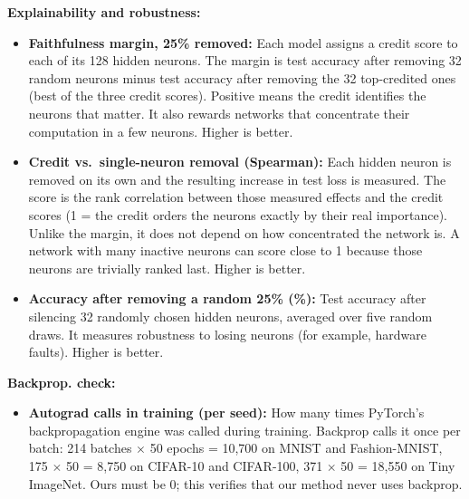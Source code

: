 \documentclass{article}
\begin{document}
{\noindent\textbf{Explainability and robustness:}
\begin{itemize}
  \item \textbf{Faithfulness margin, 25\% removed:} Each model assigns a credit score to each of its 128 hidden neurons. The margin is test accuracy after removing 32 random neurons minus test accuracy after removing the 32 top-credited ones (best of the three credit scores). Positive means the credit identifies the neurons that matter. It also rewards networks that concentrate their computation in a few neurons. Higher is better.
  \item \textbf{Credit vs.\ single-neuron removal (Spearman):} Each hidden neuron is removed on its own and the resulting increase in test loss is measured. The score is the rank correlation between those measured effects and the credit scores (1 = the credit orders the neurons exactly by their real importance). Unlike the margin, it does not depend on how concentrated the network is. A network with many inactive neurons can score close to 1 because those neurons are trivially ranked last. Higher is better.
  \item \textbf{Accuracy after removing a random 25\% (\%):} Test accuracy after silencing 32 randomly chosen hidden neurons, averaged over five random draws. It measures robustness to losing neurons (for example, hardware faults). Higher is better.
\end{itemize}

\noindent\textbf{Backprop. check:}
\begin{itemize}
  \item \textbf{Autograd calls in training (per seed):} How many times PyTorch's backpropagation engine was called during training. Backprop calls it once per batch: 214 batches $\times$ 50 epochs = 10,700 on MNIST and Fashion-MNIST, 175 $\times$ 50 = 8,750 on CIFAR-10 and CIFAR-100, 371 $\times$ 50 = 18,550 on Tiny ImageNet. Ours must be 0; this verifies that our method never uses backprop.
\end{itemize}
}
\end{document}
